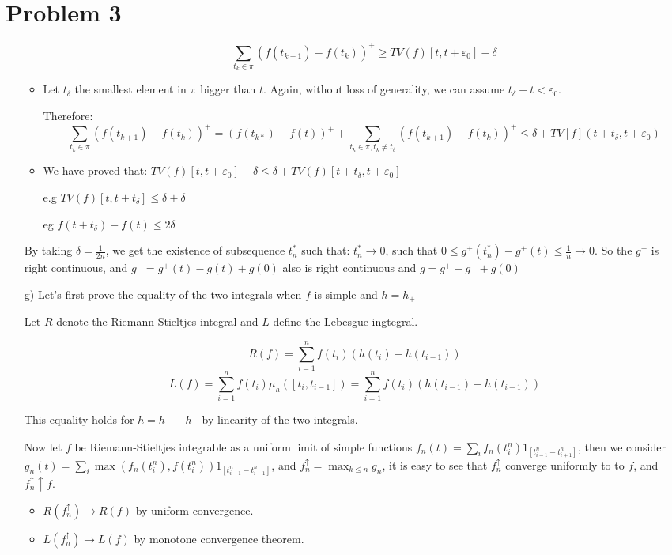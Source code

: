 \documentclass[12pt]{article}
\newenvironment{problem}[1]
{\section*{Problem #1}}{}
\begin{document}
\begin{problem}{3}
\begin{enumerate}
\begin{itemize}
        $$\sum_{t_k \in \pi} (f(t_{k+1}) -
        f(t_k))^+ \ge TV(f)[t, t+\varepsilon_0] - \delta$$
        
      \item Let $t_{\delta}$ the smallest element in $\pi$ bigger than $t$. Again, without loss of generality, we can assume $t_{\delta}-t < \varepsilon_0$.
        
        Therefore:
        $$\sum_{t_k \in \pi} (f(t_{k+1}) - f(t_k))^+ = (f(t_{k*}) - f(t))^+ + \sum_{t_k \in \pi, t_k \ne t_{\delta}} (f(t_{k+1}) - f(t_k))^+ \le  \delta + TV[f](t+t_{\delta}, t+\varepsilon_0)$$
        
      \item We have proved that:
        $TV(f)[t, t+\varepsilon_0] - \delta \le \delta + TV(f)[t+t_{\delta}, t+\varepsilon_0]$

        e.g
        $TV(f)[t, t+t_{\delta}] \le \delta + \delta$

        eg
        $f(t+t_{\delta}) - f(t) \le 2\delta$
        
      \end{itemize}
      By taking $\delta = \frac{1}{2n}$, we get the existence of subsequence $t_n^*$ such that:
      $t_n^* \rightarrow 0$, such that $0 \le g^+(t_n^*) - g^+(t) \le \frac1n \rightarrow 0$.
      So the $g^+$ is right continuous, and $g^- = g^+(t) - g(t) + g(0)$ also is right continuous and $g = g^+ - g^- + g(0)$
      
    \item[g)]
      Let's first prove the equality of the two integrals when $f$ is simple and $h = h_+$

      Let $R$ denote the Riemann-Stieltjes integral and $L$ define the Lebesgue ingtegral.
      
      $$R(f) = \sum_{i = 1}^n f(t_i) (h(t_i) - h(t_{i-1}))$$
      $$L(f) = \sum_{i = 1}^n f(t_i) \mu_h([t_i, t_{i-1}]) = \sum_{i = 1}^n f(t_i) (h(t_{i-1}) - h(t_{i-1}))$$

      This equality holds for $h = h_+ - h_-$ by linearity of the two integrals.

      Now let $f$ be Riemann-Stieltjes integrable as a uniform limit of simple functions $f_n(t) = \sum_i f_n(t^n_i) 1_{[t^n_{i-1} - t^n_{i+1}] }$, then we consider
      $g_n(t) = \sum_i \max(f_n(t^n_i), f(t^n_i)) 1_{[t^n_{i-1} - t^n_{i+1}] }$, and $f^{\uparrow}_n = \max_{k \le n} g_n$, it is easy to see that $f_n^{\uparrow}$ converge uniformly to  to $f$, and $f_n^{\uparrow} \uparrow f$.

      \begin{itemize}
      \item $R(f^\uparrow_n) \rightarrow R(f)$ by uniform convergence.
      \item $L(f^\uparrow_n) \rightarrow L(f)$ by monotone convergence theorem.
      \end{itemize}

  \end{enumerate}
\end{problem}
\end{document}
